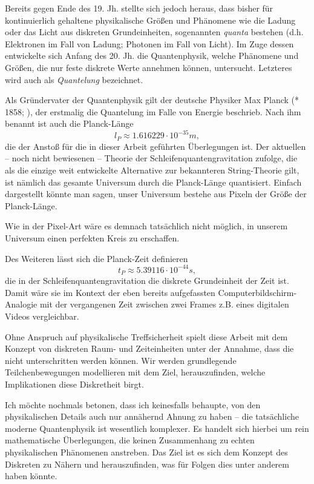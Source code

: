 \documentclass[a4paper,12pt,ngerman]{scrartcl}
\theoremstyle{plain}
\theoremstyle{plain}
\theoremstyle{plain}
\theoremstyle{plain}
\begin{document}
Bereits gegen Ende des 19. Jh. stellte sich jedoch heraus, dass bisher für kontinuierlich gehaltene physikalische Größen und Phänomene wie die Ladung oder das Licht aus diskreten Grundeinheiten, sogenannten \textit{quanta} bestehen (d.h. Elektronen im Fall von Ladung; Photonen im Fall von Licht). Im Zuge dessen entwickelte sich Anfang des 20. Jh. die Quantenphysik, welche Phänomene und Größen, die nur feste diskrete Werte annehmen können, untersucht. Letzteres wird auch als \textit{Quantelung} bezeichnet.

Als Gründervater der Quantenphysik gilt der deutsche Physiker Max Planck (* 1858; ), der erstmalig die Quantelung im Falle von Energie beschrieb. Nach ihm benannt ist auch die Planck-Länge
\[ l_P \approx 1.616 229 \cdot 10^{-35}m,\]
die der Anstoß für die in dieser Arbeit geführten Überlegungen ist. Der aktuellen -- noch nicht bewiesenen -- Theorie der Schleifenquantengravitation zufolge, die als die einzige weit entwickelte Alternative zur bekannteren String-Theorie gilt, ist nämlich das gesamte Universum durch die Planck-Länge quantisiert. Einfach dargestellt könnte man sagen, unser Universum bestehe aus Pixeln der Größe der Planck-Länge.

Wie in der Pixel-Art wäre es demnach tatsächlich nicht möglich, in unserem Universum einen perfekten Kreis zu erschaffen. 

Des Weiteren lässt sich die Planck-Zeit definieren
\[t_P \approx 5.39116\cdot 10^{-44}s,\]
die in der Schleifenquantengravitation die diskrete Grundeinheit der Zeit ist. Damit wäre sie im Kontext der eben bereits aufgefassten Computerbildschirm-Analogie mit der vergangenen Zeit zwischen zwei Frames z.B. eines digitalen Videos vergleichbar. 

Ohne Anspruch auf physikalische Treffsicherheit spielt diese Arbeit mit dem Konzept von diskreten Raum- und Zeiteinheiten unter der Annahme, dass die nicht unterschritten werden können. Wir werden grundlegende Teilchenbewegungen modellieren mit dem Ziel, herauszufinden, welche Implikationen diese Diskretheit birgt. 

Ich möchte nochmals betonen, dass ich keinesfalls behaupte, von den physikalischen Details auch nur annähernd Ahnung zu haben -- die tatsächliche moderne Quantenphysik ist wesentlich komplexer. Es handelt sich hierbei um rein mathematische Überlegungen, die keinen Zusammenhang zu echten physikalischen Phänomenen anstreben. Das Ziel ist es sich dem Konzept des Diskreten zu Nähern und herauszufinden, was für Folgen dies unter anderem haben könnte. %
\end{document}
